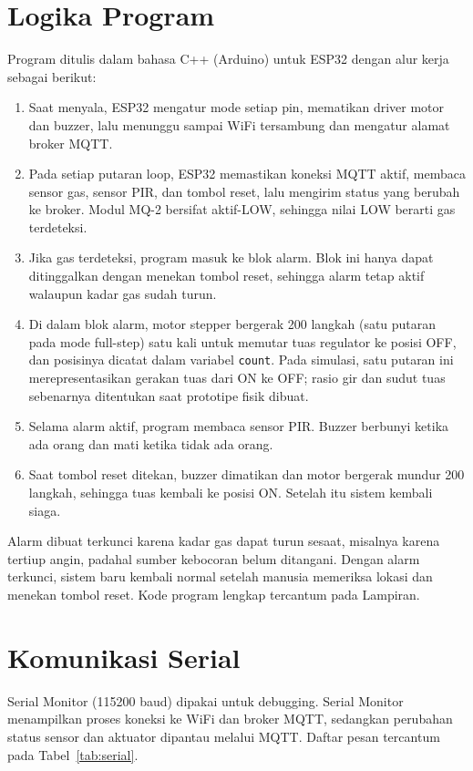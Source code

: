 \documentclass[12pt,a4paper,oneside]{report}
\newcommand{\kode}[1]{\texttt{#1}}
\begin{document}
\section{Logika Program}
Program ditulis dalam bahasa C++ (Arduino) untuk ESP32 dengan alur kerja sebagai berikut:
\begin{enumerate}
  \item Saat menyala, ESP32 mengatur mode setiap pin, mematikan driver motor dan buzzer, lalu menunggu sampai WiFi tersambung dan mengatur alamat broker MQTT.
  \item Pada setiap putaran loop, ESP32 memastikan koneksi MQTT aktif, membaca sensor gas, sensor PIR, dan tombol reset, lalu mengirim status yang berubah ke broker. Modul MQ-2 bersifat aktif-LOW, sehingga nilai LOW berarti gas terdeteksi.
  \item Jika gas terdeteksi, program masuk ke blok alarm. Blok ini hanya dapat ditinggalkan dengan menekan tombol reset, sehingga alarm tetap aktif walaupun kadar gas sudah turun.
  \item Di dalam blok alarm, motor stepper bergerak 200 langkah (satu putaran pada mode full-step) satu kali untuk memutar tuas regulator ke posisi OFF, dan posisinya dicatat dalam variabel \kode{count}. Pada simulasi, satu putaran ini merepresentasikan gerakan tuas dari ON ke OFF; rasio gir dan sudut tuas sebenarnya ditentukan saat prototipe fisik dibuat.
  \item Selama alarm aktif, program membaca sensor PIR. Buzzer berbunyi ketika ada orang dan mati ketika tidak ada orang.
  \item Saat tombol reset ditekan, buzzer dimatikan dan motor bergerak mundur 200 langkah, sehingga tuas kembali ke posisi ON. Setelah itu sistem kembali siaga.
\end{enumerate}

Alarm dibuat terkunci karena kadar gas dapat turun sesaat, misalnya karena tertiup angin, padahal sumber kebocoran belum ditangani. Dengan alarm terkunci, sistem baru kembali normal setelah manusia memeriksa lokasi dan menekan tombol reset. Kode program lengkap tercantum pada Lampiran.

\section{Komunikasi Serial}
Serial Monitor (115200 baud) dipakai untuk debugging. Serial Monitor menampilkan proses koneksi ke WiFi dan broker MQTT, sedangkan perubahan status sensor dan aktuator dipantau melalui MQTT. Daftar pesan tercantum pada Tabel~\ref{tab:serial}.
\end{document}
